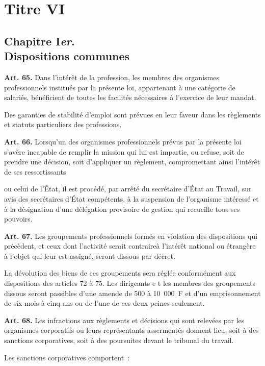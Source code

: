 \documentclass[french,twoside]{book} %
\newcommand{\labelchar}[1]{\textbf{\color{rubric} #1}}
\begin{document}
\section[Titre VI]{Titre VI}
\subsection[Chapitre Ier. Dispositions communes]{Chapitre I\emph{er}. \\
Dispositions communes}
\noindent \labelchar{Art. 65.} Dans l’intérêt de la profession, les membres des organismes professionnels institués par la présente loi, appartenant à une catégorie de salariés, bénéficient de toutes les facilités nécessaires à l’exercice de leur mandat.\par
Des garanties de stabilité d’emploi sont prévues en leur faveur dans les règlements et statuts particuliers des professions.\par
\bigbreak
\noindent \labelchar{Art. 66.} Lorsqu’un des organismes professionnels prévus par la présente loi s’avère incapable de remplir la mission qui lui est impartie, ou refuse, soit de prendre une décision, soit d’appliquer un règlement, compromettant ainsi l’intérêt de ses ressortissants\par
ou celui de l’État, il est procédé, par arrêté du secrétaire d’État au Travail, sur avis des secrétaires d’État compétents, à la suspension de l’organisme intéressé et à la désignation d’une délégation provisoire de gestion qui recueille tous ses pouvoirs.\par
\bigbreak
\noindent \labelchar{Art. 67.} Les groupements professionnels formés en violation des dispositions qui précèdent, et ceux dont l’activité serait contraireà l’intérêt national ou étrangère à l’objet qui leur est assigné, seront dissous par décret.\par
La dévolution des biens de ces groupements sera réglée conformément aux dispositions des articles 72 à 75. Les dirigeants e t les membres des groupements dissous seront passibles d’une amende de 500 à 10 000 F et d’un emprisonnement de six mois à cinq ans ou de l’une de ces deux peines seulement.\par
\bigbreak
\noindent \labelchar{Art. 68.} Les infractions aux règlements et décisions qui sont relevées par les organismes corporatifs ou leurs représentants assermentés donnent lieu, soit à des sanctions corporatives, soit à des poursuites devant le tribunal du travail.\par
Les sanctions corporatives comportent :\par
\end{document}
